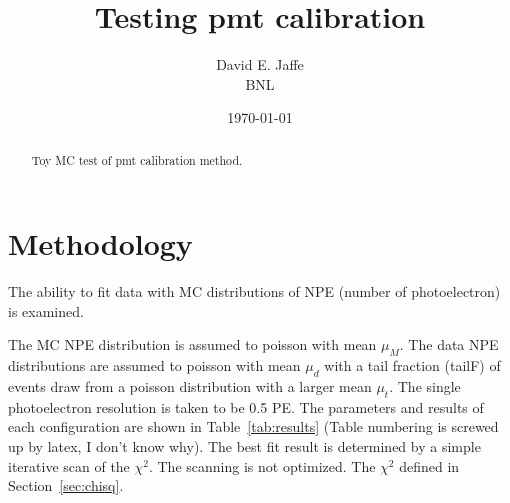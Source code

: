 \documentclass[12pt]{article}
\begin{document}
\title{Testing pmt calibration}

\author{David E. Jaffe \\ BNL}
\date{\today}
\maketitle
\begin{abstract}
{
Toy MC test of pmt calibration method.
}
\end{abstract}

\section{Methodology}

The ability to fit data with MC distributions of NPE (number of photoelectron) is examined.

The MC NPE distribution is assumed to poisson with mean $\mu_M$.
The data NPE distributions are assumed to poisson with mean $\mu_d$ with 
a tail fraction (tailF) of events draw from a poisson distribution with a larger mean $\mu_t$.
The single photoelectron resolution is taken to be 0.5 PE.
The parameters and results of each configuration are shown in Table~\ref{tab:results} (Table numbering is screwed up by latex, I don't know why). 
The best fit result is determined by a simple iterative scan of the $\chi^2$. The scanning is not optimized. 
The $\chi^2$ defined in Section~\ref{sec:chisq}.
\end{document}
